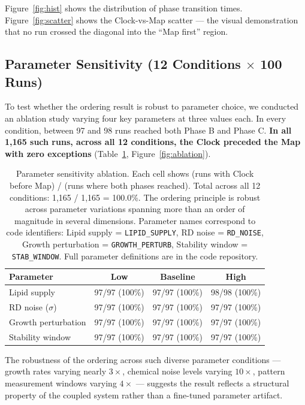 \documentclass[11pt,letterpaper]{article}
\begin{document}
Figure~\ref{fig:hist} shows the distribution of phase transition times. Figure~\ref{fig:scatter} shows the Clock-vs-Map scatter --- the visual demonstration that no run crossed the diagonal into the ``Map first'' region.

\subsection{Parameter Sensitivity (12 Conditions $\times$ 100 Runs)}

To test whether the ordering result is robust to parameter choice, we conducted an ablation study varying four key parameters at three values each. In every condition, between 97 and 98 runs reached both Phase B and Phase C. \textbf{In all 1{,}165 such runs, across all 12 conditions, the Clock preceded the Map with zero exceptions} (Table~\ref{tab:ablation}, Figure~\ref{fig:ablation}).

\begin{table}[H]
\centering
\small
\begin{tabular}{lccc}
\toprule
\textbf{Parameter} & \textbf{Low} & \textbf{Baseline} & \textbf{High} \\
\midrule
Lipid supply         & 97/97 (100\%) & 97/97 (100\%) & 98/98 (100\%) \\
RD noise ($\sigma$)  & 97/97 (100\%) & 97/97 (100\%) & 97/97 (100\%) \\
Growth perturbation  & 97/97 (100\%) & 97/97 (100\%) & 97/97 (100\%) \\
Stability window     & 97/97 (100\%) & 97/97 (100\%) & 97/97 (100\%) \\
\bottomrule
\end{tabular}
\caption{\label{tab:ablation}Parameter sensitivity ablation. Each cell shows (runs with Clock before Map) / (runs where both phases reached). Total across all 12 conditions: 1{,}165 / 1{,}165 = 100.0\%. The ordering principle is robust across parameter variations spanning more than an order of magnitude in several dimensions. Parameter names correspond to code identifiers: Lipid supply = \texttt{LIPID\_SUPPLY}, RD noise = \texttt{RD\_NOISE}, Growth perturbation = \texttt{GROWTH\_PERTURB}, Stability window = \texttt{STAB\_WINDOW}. Full parameter definitions are in the code repository.}
\end{table}

The robustness of the ordering across such diverse parameter conditions --- growth rates varying nearly $3\times$, chemical noise levels varying $10\times$, pattern measurement windows varying $4\times$ --- suggests the result reflects a structural property of the coupled system rather than a fine-tuned parameter artifact.
\end{document}
